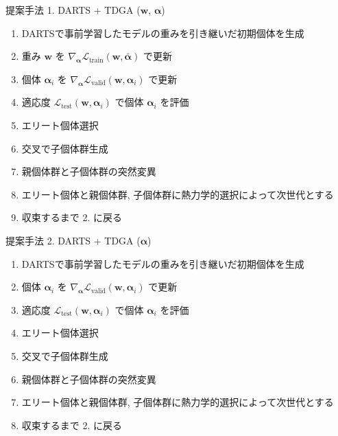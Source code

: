 \begin{algorithm}[tb]
  \caption{提案手法 1. DARTS + TDGA ($\bm{w}$, $\bm{\alpha}$)}
  \label{alg1}
  \begin{enumerate}
    \item DARTSで事前学習したモデルの重みを引き継いだ初期個体を生成
    \item 重み $\bm{w}$ を $\displaystyle \nabla_{\bm{\alpha}} \mathcal{L}_{\mathrm{train}}(\bm{w}, \bar{\bm{\alpha}})$ で更新
    \item 個体 $\bm{\alpha}_i$ を $\displaystyle \nabla_{\bm{\alpha}} \mathcal{L}_{\mathrm{valid}}(\bm{w}, \bm{\alpha}_i)$ で更新
    \item 適応度 $\displaystyle \mathcal{L}_{\mathrm{test}}(\bm{w}, \bm{\alpha}_i)$ で個体 $\bm{\alpha}_i$ を評価
    \item エリート個体選択
    \item 交叉で子個体群生成
    \item 親個体群と子個体群の突然変異
    \item エリート個体と親個体群, 子個体群に熱力学的選択によって次世代とする
    \item 収束するまで 2. に戻る
  \end{enumerate}
\end{algorithm}


\begin{algorithm}[tb]
  \caption{提案手法 2. DARTS + TDGA ($\bm{\alpha}$)}
  \label{alg2}
  \begin{enumerate}
    \item DARTSで事前学習したモデルの重みを引き継いだ初期個体を生成
    \item 個体 $\bm{\alpha}_i$ を $\displaystyle \nabla_{\bm{\alpha}} \mathcal{L}_{\mathrm{valid}}(\bm{w}, \bm{\alpha}_i)$ で更新
    \item 適応度 $\displaystyle \mathcal{L}_{\mathrm{test}}(\bm{w}, \bm{\alpha}_i)$ で個体 $\bm{\alpha}_i$ を評価
    \item エリート個体選択
    \item 交叉で子個体群生成
    \item 親個体群と子個体群の突然変異
    \item エリート個体と親個体群, 子個体群に熱力学的選択によって次世代とする
    \item 収束するまで 2. に戻る
  \end{enumerate}
\end{algorithm}

